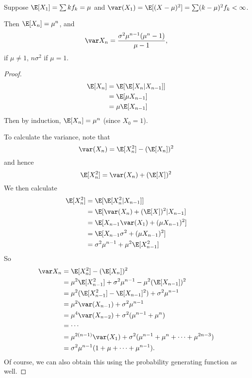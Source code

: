 \documentclass[a4paper]{article}
\begin{document}
\begin{thm}
  Suppose $\E[X_1] = \sum k f_k = \mu$ and $\var (X_1) = \E[(X - \mu)^2] = \sum (k - \mu)^2 f_k < \infty$.

  Then $\E[X_n] = \mu^n$, and
  \[
    \var X_n = \frac{\sigma^2\mu^{n - 1}(\mu^n - 1)}{\mu - 1},
  \]
  if $\mu \not = 1$, $n\sigma^2$ if $\mu = 1$.
\end{thm}
\begin{proof}
\begin{align*}
  \E[X_n] &= \E[\E[X_n|X_{n - 1}]]\\
  &= \E[\mu X_{n - 1}]\\
  &= \mu \E[X_{n - 1}]\\
\end{align*}
Then by induction, $\E[X_n] = \mu^n$ (since $X_0 = 1$).

To calculate the variance, note that
\[
  \var (X_n) = \E[X_n^2] - (\E[X_n])^2
\]
and hence
\[
  \E[X_n^2] = \var(X_n) + (\E[X])^2
\]
We then calculate
\begin{align*}
  \E[X_n^2] &= \E[\E[X_n^2|X_{n - 1}]]\\
  &= \E[\var(X_n) + (\E[X])^2 | X_{n - 1}]\\
  &= \E[X_{n - 1}\var (X_1) + (\mu X_{n - 1})^2]\\
  &= \E[X_{n - 1}\sigma^2 + (\mu X_{n - 1})^2]\\
  &= \sigma^2 \mu^{n - 1} + \mu^2 \E[X_{n - 1}^2]
\end{align*}
So
\begin{align*}
  \var X_n &= \E[X_n^2] - (\E[X_n])^2 \\
  &= \mu^2 \E[X_{n -1}^2] + \sigma^2 \mu^{n - 1} - \mu^2 (\E[X_{n - 1}])^2\\
  &= \mu^2(\E[X_{n - 1}^2] - \E[X_{n - 1}]^2) + \sigma^2\mu^{n - 1}\\
  &= \mu^2 \var (X_{n - 1}) + \sigma^2 \mu^{n -1 }\\
  &= \mu^4 \var(X_{n - 2}) + \sigma^2(\mu^{n - 1} + \mu^n)\\
  &= \cdots\\
  &= \mu^{2(n - 1)}\var (X_1) + \sigma^2 (\mu^{n - 1} + \mu^{n} + \cdots + \mu^{2n - 3})\\
  &= \sigma^2\mu^{n - 1}(1 + \mu + \cdots + \mu^{n - 1}).
\end{align*}
Of course, we can also obtain this using the probability generating function as well.
\end{proof}
\end{document}

